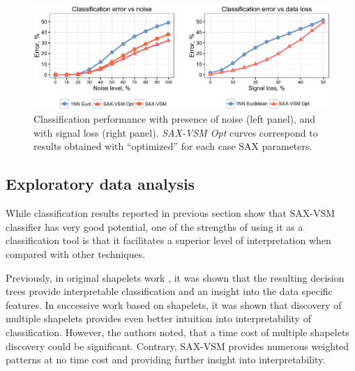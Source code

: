 \documentclass{llncs}
\newcommand{\myfigureshrinker}{\vspace{-1cm}}
\begin{document}
\begin{figure}[t]
  \myfigureshrinker
  \centering
  \includegraphics[width=115mm]{figures/corrupted.eps}
  \caption{Classification performance with presence of noise
 (left panel), and with signal loss (right panel). \textit{SAX-VSM Opt} curves correspond to 
 results obtained with ``optimized''  for each case SAX parameters.}
  \label{fig:corrupted}
\end{figure}

\subsection{Exploratory data analysis}
While classification results reported in previous section show that SAX-VSM classifier
has very good potential, one of the strengths of using it as a classification tool is that
it facilitates a superior level of interpretation when compared with other techniques. 

Previously, in original shapelets work \cite{shapelet}, it was shown 
that the resulting decision trees provide interpretable classification and an insight into the data
specific features. In successive work \cite{bagnal} based on shapelets, it was shown that
discovery of multiple shapelets provides even better intuition into interpretability of
classification. However, the authors noted, that a time cost of multiple shapelets discovery
could be significant. Contrary, SAX-VSM provides numerous weighted patterns at no time cost 
and providing further insight into interpretability.
\end{document}
